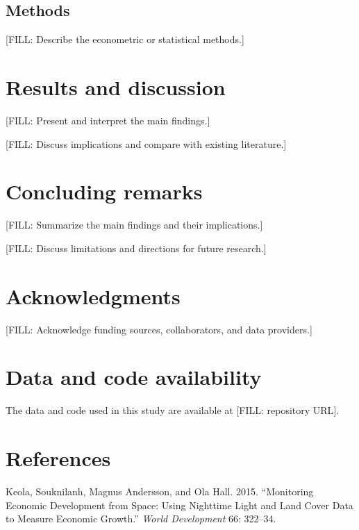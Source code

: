 \documentclass[
  letterpaper,
  DIV=11,
  numbers=noendperiod]{scrartcl}
\newlength{\cslhangindent}
\newenvironment{CSLReferences}[2] %
 {\begin{list}{}{%
  \setlength{\itemindent}{0pt}
  \setlength{\leftmargin}{0pt}
  \setlength{\parsep}{0pt}
  \ifodd #1
   \setlength{\leftmargin}{\cslhangindent}
   \setlength{\itemindent}{-1\cslhangindent}
  \fi
  \setlength{\itemsep}{#2\baselineskip}}}
 {\end{list}}
\begin{document}
\subsection{Methods}\label{methods}

{[}FILL: Describe the econometric or statistical methods.{]}

\section{Results and discussion}\label{sec-results}

{[}FILL: Present and interpret the main findings.{]}

{[}FILL: Discuss implications and compare with existing literature.{]}

\section{Concluding remarks}\label{sec-conclusion}

{[}FILL: Summarize the main findings and their implications.{]}

{[}FILL: Discuss limitations and directions for future research.{]}

\section{Acknowledgments}\label{acknowledgments}

{[}FILL: Acknowledge funding sources, collaborators, and data
providers.{]}

\section{Data and code availability}\label{data-and-code-availability}

The data and code used in this study are available at {[}FILL:
repository URL{]}.

\section*{References}\label{references}

\label{refs}
\begin{CSLReferences}{1}{0}
Keola, Souknilanh, Magnus Andersson, and Ola Hall. 2015. {``Monitoring
Economic Development from Space: Using Nighttime Light and Land Cover
Data to Measure Economic Growth.''} \emph{World Development} 66:
322--34.

\end{CSLReferences}
\end{document}
